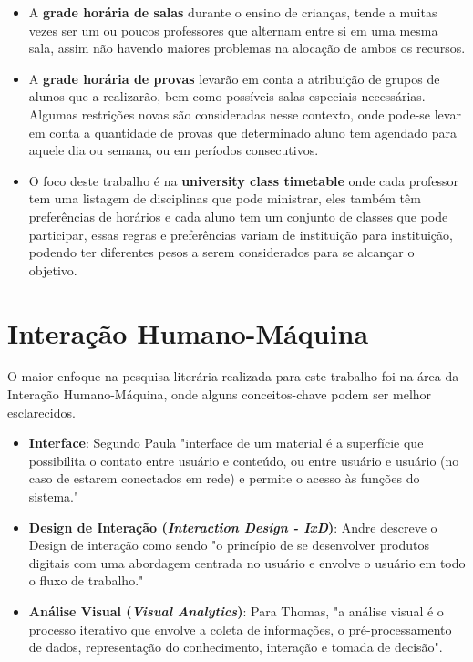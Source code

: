         \begin{itemize}
            \item A \textbf{grade horária de salas} durante o ensino de crianças, tende a muitas vezes ser um ou poucos professores que alternam entre si em uma mesma sala, assim não havendo maiores problemas na alocação de ambos os recursos.
            \item A \textbf{grade horária de provas} levarão em conta a atribuição de grupos de alunos que a realizarão, bem como possíveis salas especiais necessárias. Algumas restrições novas são consideradas nesse contexto, onde pode-se levar em conta a quantidade de provas que determinado aluno tem agendado para aquele dia ou semana, ou em períodos consecutivos.
            \item O foco deste trabalho é na \textbf{university class timetable} onde cada professor tem uma listagem de disciplinas que pode ministrar, eles também têm preferências de horários e cada aluno tem um conjunto de classes que pode participar, essas regras e preferências variam de instituição para instituição, podendo ter diferentes pesos a serem considerados para se alcançar o objetivo.
        \end{itemize}

\section{Interação Humano-Máquina}

    O maior enfoque na pesquisa literária realizada para este trabalho foi na área da Interação Humano-Máquina, onde alguns conceitos-chave podem ser melhor esclarecidos.
    
    \begin{itemize}
        \item \textbf{Interface}: Segundo Paula \cite{PAULA2011} "interface de um material é a superfície que possibilita o contato entre usuário e conteúdo, ou entre usuário e usuário (no caso de estarem conectados em rede) e permite o acesso às funções do sistema."
        \item \textbf{Design de Interação (\textit{Interaction Design - IxD})}: Andre \cite{ANDRE2018} descreve o Design de interação como sendo "o princípio de se desenvolver produtos digitais com uma abordagem centrada no usuário e envolve o usuário em todo o fluxo de trabalho."
        \item \textbf{Análise Visual (\textit{Visual Analytics})}: Para Thomas, \cite{THOMAS2009} "a análise visual é o processo iterativo que envolve a coleta de informações, o pré-processamento de dados, representação do conhecimento, interação e tomada de decisão".
    \end{itemize}
    